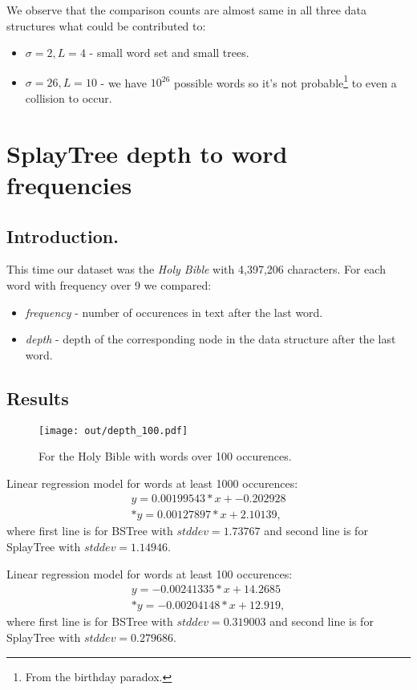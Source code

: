 \documentclass[12pt,a4paper]{article}
\begin{document}
We observe that the comparison counts are almost same in all three data structures what could be contributed to: 
\begin{itemize} 
\item $\sigma=2, L=4$ - small word set and small trees. 
\item $\sigma=26, L=10$ - we have $10^{26}$ possible words so it's not probable\footnote{
From the birthday paradox. 
} to even a collision to occur. 
\end{itemize} 

\newpage
\section{SplayTree depth to word frequencies}
\subsection{Introduction.} 
This time our dataset was the \emph{Holy Bible} with 4,397,206 characters. For each word with frequency over 9 we compared:
\begin{itemize} 
\item \emph{frequency} - number of occurences in text after the last word. 
\item \emph{depth} - depth of the corresponding node in the data structure after the last word. 
\end{itemize} 

\subsection{Results} 

\begin{figure}[h]
  \centering
  \texttt{[image: out/depth\_100.pdf]}
  \caption{For the Holy Bible with words over 100 occurences.}
  \label{fig:depth_to_freq}
\end{figure}

Linear regression model for words at least 1000 occurences:  
\begin{align} 
y = 0.00199543*x + -0.202928 \\*
y = 0.00127897*x + 2.10139, 
\end{align} 
where first line is for BSTree with $stddev=1.73767$ and second line is for SplayTree with $stddev=1.14946$. 

Linear regression model for words at least 100 occurences:  
\begin{align} 
y = -0.00241335*x + 14.2685 \\*
y = -0.00204148*x + 12.919, 
\end{align} 
where first line is for BSTree with $stddev=0.319003$ and second line is for SplayTree with $stddev=0.279686$. 
\end{document}
